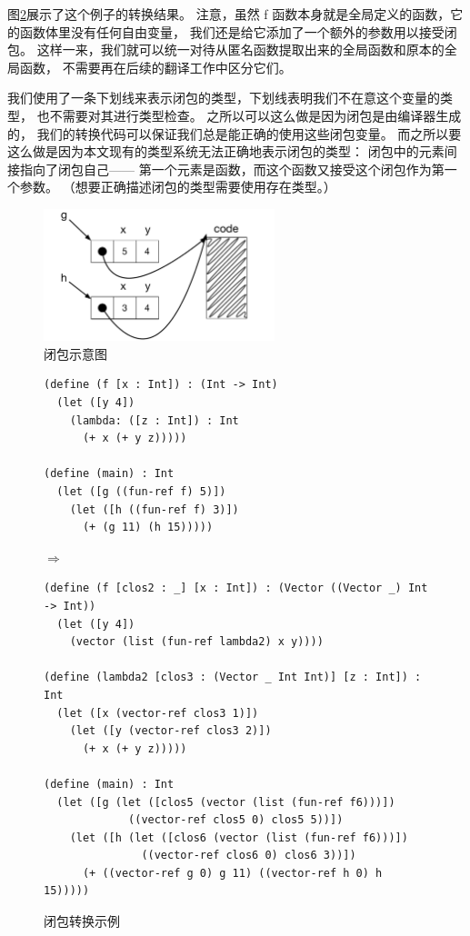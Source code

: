 图\ref{fig:colure-conversion-eg}展示了这个例子的转换结果。
注意，虽然 f 函数本身就是全局定义的函数，它的函数体里没有任何自由变量，
我们还是给它添加了一个额外的参数用以接受闭包。
这样一来，我们就可以统一对待从匿名函数提取出来的全局函数和原本的全局函数，
不需要再在后续的翻译工作中区分它们。

我们使用了一条下划线来表示闭包的类型，下划线表明我们不在意这个变量的类型，
也不需要对其进行类型检查。
之所以可以这么做是因为闭包是由编译器生成的，
我们的转换代码可以保证我们总是能正确的使用这些闭包变量。
而之所以要这么做是因为本文现有的类型系统无法正确地表示闭包的类型：
闭包中的元素间接指向了闭包自己——
第一个元素是函数，而这个函数又接受这个闭包作为第一个参数。
（想要正确描述闭包的类型需要使用存在类型\cite{Minamide_Morrisett_Harper_1996}。）


\begin{figure}[t]
\centering \includegraphics[width=0.6\textwidth]{figures/closures}
\caption{闭包示意图}
\label{fig:closure-eg}
\end{figure}


\begin{figure}[tbp]
\begin{center}
  \begin{minipage}{0.92\textwidth}
\begin{lstlisting}[basicstyle=\ttfamily\footnotesize]
(define (f [x : Int]) : (Int -> Int)
  (let ([y 4])
    (lambda: ([z : Int]) : Int
      (+ x (+ y z)))))

(define (main) : Int
  (let ([g ((fun-ref f) 5)])
    (let ([h ((fun-ref f) 3)])
      (+ (g 11) (h 15)))))
\end{lstlisting}
$\Rightarrow$
\begin{lstlisting}[basicstyle=\ttfamily\footnotesize]
(define (f [clos2 : _] [x : Int]) : (Vector ((Vector _) Int -> Int))
  (let ([y 4])
    (vector (list (fun-ref lambda2) x y))))

(define (lambda2 [clos3 : (Vector _ Int Int)] [z : Int]) : Int
  (let ([x (vector-ref clos3 1)])
    (let ([y (vector-ref clos3 2)])
      (+ x (+ y z)))))

(define (main) : Int
  (let ([g (let ([clos5 (vector (list (fun-ref f6)))])
             ((vector-ref clos5 0) clos5 5))])
    (let ([h (let ([clos6 (vector (list (fun-ref f6)))])
               ((vector-ref clos6 0) clos6 3))])
      (+ ((vector-ref g 0) g 11) ((vector-ref h 0) h 15)))))
\end{lstlisting}
\end{minipage}

\caption{闭包转换示例}
\label{fig:colure-conversion-eg}
\end{center}
\end{figure}


